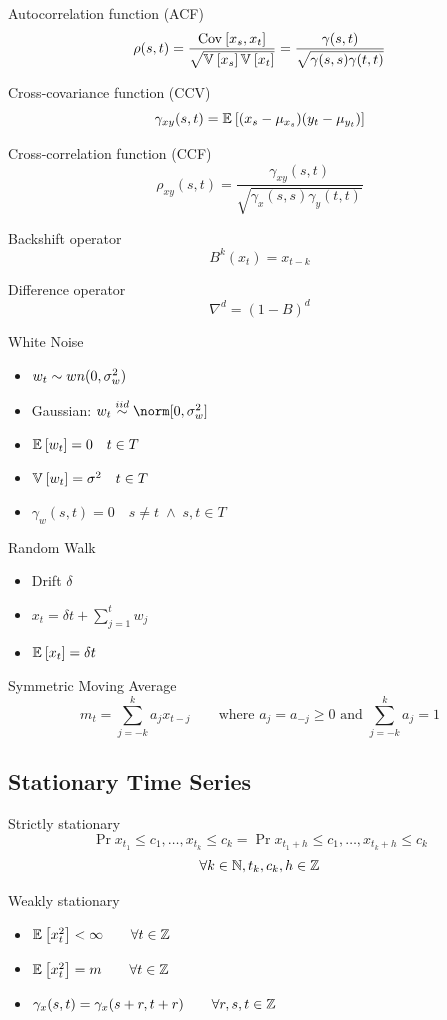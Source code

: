\documentclass[landscape]{article}
\begin{document}
\begin{multicols*}{2}
Autocorrelation function (ACF)
$$\rho(s,t) = \frac{\mathrm{Cov}_{}\left[x_s,x_t\right]}{\sqrt{\mathbb{V}_{}\left[x_s\right]\mathbb{V}_{}\left[x_t\right]}}
            = \frac{\gamma(s,t)}{\sqrt{\gamma(s,s)\gamma(t,t)}}$$

Cross-covariance function (CCV)
$$\gamma_{xy}(s,t) = \mathbb{E}_{}\left[(x_s-\mu_{x_s})(y_t-\mu_{y_t})\right]$$

Cross-correlation function (CCF)
$$\rho_{xy}(s,t) = \frac{\gamma_{xy}(s,t)}{\sqrt{\gamma_x(s,s)\gamma_y(t,t)}}$$

Backshift operator
$$B^k(x_t) = x_{t-k}$$

Difference operator
$$\nabla^d = (1-B)^d$$

White Noise 
\begin{itemize}
  \item $w_t \sim wn(0, \sigma_w^2)$
  \item Gaussian: $w_t \distiid \norm[0, \sigma_w^2]$
  \item $\mathbb{E}_{}\left[w_t\right] = 0 \quad t\in T$
  \item $\mathbb{V}_{}\left[w_t\right] = \sigma^2 \quad t\in T$
  \item $\gamma_w(s,t) = 0 \quad s \neq t \;\wedge\; s,t\in T$
\end{itemize}


Random Walk
\begin{itemize}
  \item Drift $\delta$
  \item $x_t = \delta t + \sum_{j=1}^t w_j$
  \item $\mathbb{E}_{}\left[x_t\right] = \delta t$
\end{itemize}

Symmetric Moving Average
$$m_t = \sum_{j=-k}^k a_j x_{t-j} 
\qquad \text{where } a_j = a_{-j} \ge 0 \text{ and } \sum_{j=-k}^k a_j = 1$$

\subsection{Stationary Time Series}

Strictly stationary
$$\Pr{x_{t_1} \le c_1, \dots, x_{t_k} \le c_k} = 
  \Pr{x_{t_1+h} \le c_1, \dots, x_{t_k+h} \le c_k}$$
$$\forall k\in\mathbb{N},t_k, c_k, h\in\mathbb{Z}$$

Weakly stationary
\begin{itemize}
  \item $\mathbb{E}_{}\left[x_t^2\right] < \infty \qquad\forall t\in\mathbb{Z}$
  \item $\mathbb{E}_{}\left[x_t^2\right] = m \qquad\forall t\in\mathbb{Z}$
  \item $\gamma_x(s,t) = \gamma_x(s+r, t+r) \qquad\forall r,s,t\in\mathbb{Z}$
\end{itemize}


\end{multicols*}
\end{document}
